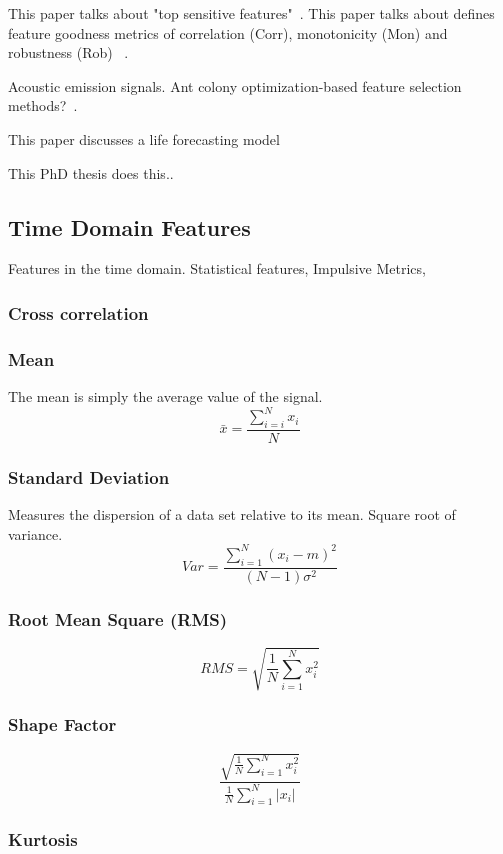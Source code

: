 \documentclass{article}
\begin{document}
This paper talks about "top sensitive features"~\cite{bleakie2013feature}.
This paper talks about defines feature goodness metrics of correlation (Corr), monotonicity (Mon) and robustness (Rob) ~\cite{zhang2016degradation}.

Acoustic emission signals. Ant colony optimization-based feature selection methods?~\cite{liao2010feature}.

This paper discusses a life forecasting model~\cite{wang2016multiple}

This PhD thesis does this..~\cite{martin2017unsupervised}

\subsection{Time Domain Features} 	
Features in the time domain. Statistical features, Impulsive Metrics, 
\subsubsection{Cross correlation}
\subsubsection{Mean}
The mean is simply the average value of the signal.
$$ \bar{x} = \frac{\sum^N_{i=i} x_i}{N} $$
\subsubsection{Standard Deviation}  
Measures the dispersion of a data set relative to its mean. Square root of variance.
$$ Var =\frac{\sum^N_{i=1}(x_i-m)^2}{(N-1)\sigma^2} $$
\subsubsection{Root Mean Square (RMS)}

$$ RMS = \sqrt{\frac{1}{N} \sum^N_{i=1}x^2_i} $$
\subsubsection{Shape Factor}

$$ \frac{ \sqrt{\frac{1}{N} \sum^N_{i=1}x_i^2} }  {\frac{1}{N}\sum^N_{i=1}|x_i|} $$
\subsubsection{Kurtosis}
\end{document}
